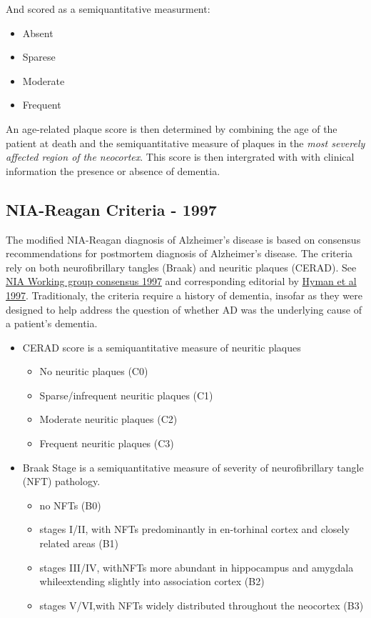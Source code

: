 \documentclass[]{book}
\providecommand{\tightlist}{%
  \setlength{\itemsep}{0pt}\setlength{\parskip}{0pt}}
\begin{document}
And scored as a semiquantitative measurment:

\begin{itemize}
\tightlist
\item
  Absent
\item
  Sparese
\item
  Moderate
\item
  Frequent
\end{itemize}

An age-related plaque score is then determined by combining the age of the patient at death and the semiquantitative measure of plaques in the \emph{most severely affected region of the neocortex}. This score is then intergrated with with clinical information the presence or absence of dementia.

\hypertarget{nia-reagan-criteria---1997}{%
\subsection{NIA-Reagan Criteria - 1997}\label{nia-reagan-criteria---1997}}

The modified NIA-Reagan diagnosis of Alzheimer's disease is based on consensus recommendations for postmortem diagnosis of Alzheimer's disease. The criteria rely on both neurofibrillary tangles (Braak) and neuritic plaques (CERAD). See \href{https://doi.org/10.1016/S0197-4580(97)00057-2}{NIA Working group consensus 1997} and corresponding editorial by \href{https://doi.org/10.1097/00005072-199710000-00002}{Hyman et al 1997}. Traditionaly, the criteria require a history of dementia, insofar as they were designed to help address the question of whether AD was the underlying cause of a patient's dementia.

\begin{itemize}
\tightlist
\item
  CERAD score is a semiquantitative measure of neuritic plaques

  \begin{itemize}
  \tightlist
  \item
    No neuritic plaques (C0)
  \item
    Sparse/infrequent neuritic plaques (C1)
  \item
    Moderate neuritic plaques (C2)
  \item
    Frequent neuritic plaques (C3)
  \end{itemize}
\item
  Braak Stage is a semiquantitative measure of severity of neurofibrillary tangle (NFT) pathology.

  \begin{itemize}
  \tightlist
  \item
    no NFTs (B0)
  \item
    stages I/II, with NFTs predominantly in en-torhinal cortex and closely related areas (B1)
  \item
    stages III/IV, withNFTs more abundant in hippocampus and amygdala whileextending slightly into association cortex (B2)
  \item
    stages V/VI,with NFTs widely distributed throughout the neocortex (B3)
  \end{itemize}
\end{itemize}
\end{document}
